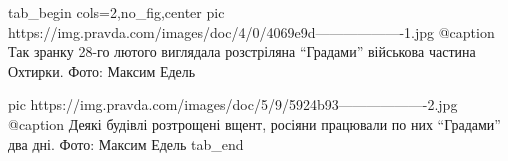  
 
 
 
 

\ifcmt
  tab_begin cols=2,no_fig,center
     pic https://img.pravda.com/images/doc/4/0/4069e9d-------------------1.jpg
		 @caption Так зранку 28-го лютого виглядала розстріляна \enquote{Градами} військова частина Охтирки. Фото: Максим Едель

		 pic https://img.pravda.com/images/doc/5/9/5924b93-------------------2.jpg
		 @caption Деякі будівлі розтрощені вщент, росіяни працювали по них \enquote{Градами} два дні. Фото: Максим Едель 
  tab_end
\fi
